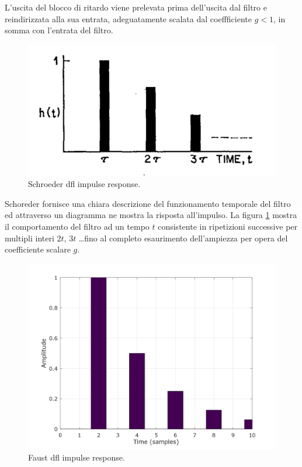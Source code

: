 \begin{refsection}
L'uscita del blocco di ritardo viene prelevata prima dell'uscita dal filtro e
reindirizzata alla sua entrata, adeguatamente scalata dal coeffficiente $g < 1$,
in somma con l'entrata del filtro.

\begin{figure}[ht]
  \centering
  \includegraphics[width=\textwidth]{CAPITOLI/0500/IMG/dfl-ir.png}
  \caption[]{Schroeder dfl impulse response.}
  \label{schroeder:dflir}
\end{figure}

Schoreder fornisce una chiara descrizione del funzionamento temporale del filtro
ed attraverso un diagramma ne mostra la risposta all'impulso. La figura
\ref{schroeder:dflir} mostra il comportamento del filtro ad un tempo $t$
consistente in ripetizioni successive per multipli interi $2t$, $3t$ \ldots fino
al completo esaurimento dell'ampiezza per opera del coefficiente scalare $g$.

\begin{figure}[ht]
  \centering
  \includegraphics[width=\textwidth]{CAPITOLI/0500/CODES/REV/dfl.png}
  \caption[]{Faust dfl impulse response.}
  \label{faust:dflir}
\end{figure}


\end{refsection}
